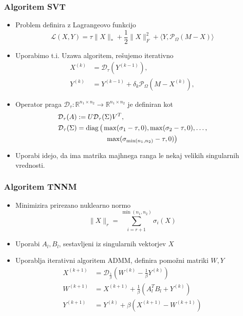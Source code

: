\documentclass{beamer}
\newcommand{\nnorm}[1]{\lVert#1\rVert_*}
\newcommand{\fnorm}[1]{\lVert#1\rVert_F}
\newcommand{\norm}[1]{\lVert#1\rVert}
\newcommand{\proj}{\mathcal{P}_\Omega}
\newcommand{\shrink}{\mathcal{D}}
\newcommand{\trOp}[2]{\langle #1, #2 \rangle}
\DeclareMathOperator{\diag}{diag}
\begin{document}
\begin{frame}
  \frametitle{Algoritem SVT}
  \begin{itemize}
    \item Problem definira z \alert{Lagrangeovo funkcijo} \[
            \mathcal{L}(X, Y) = \tau \nnorm{X} + \frac{1}{2}\fnorm{X}^2 + \trOp{Y}{\proj(M-X)}
          \]
    \item Uporabimo t.i. \alert{Uzawa algoritem}, rešujemo iterativno
          \begin{align*}
            X^{(k)} & = \shrink_\tau(Y^{(k-1)}),                 \\
            Y^{(k)} & = Y^{(k-1)} + \delta_k \proj(M - X^{(k)}),
          \end{align*}
    \item \alert{Operator praga} $\shrink_\tau: \mathbb{R}^{n_1 \times n_2} \rightarrow \mathbb{R}^{n_1 \times n_2}$ je definiran kot
          \begin{align*}
            \shrink_\tau(A) & := U \shrink_\tau(\Sigma) V^T, \\ \shrink_\tau(\Sigma) &= \diag\big(\max(\sigma_1 - \tau, 0),
            \max(\sigma_2-\tau,0),\ldots,                    \\
                            & \hspace{1.5cm}
            \max(\sigma_{\min(n_1,n_2)}-\tau,0)\big)
          \end{align*}
    \item Uporabi idejo, da ima matrika majhnega ranga \alert{le nekaj velikih singularnih vrednosti}.
  \end{itemize}
\end{frame}

\begin{frame}
  \frametitle{Algoritem TNNM}
  \begin{itemize}
    \item Minimizira \alert{prirezano nuklearno normo} \[
            \norm{X}_r = \sum_{i = r + 1}^{\min(n_1, n_2)} \sigma_i(X)
          \]
    \item Uporabi $A_l, B_l$, sestavljeni iz \alert{singularnih vektorjev} $X$
    \item Uporablja iterativni algoritem \alert{ADMM}, definira pomožni matriki $W, Y$
          \begin{align*}
            X^{(k+1)} & = \shrink_\frac{1}{\beta}(W^{(k)} - \frac{1}{\beta} Y^{(k)}) \\
            W^{(k+1)} & = X^{(k+1)} + \frac{1}{\beta}(A_l^T B_l + Y^{(k)})           \\
            Y^{(k+1)} & = Y^{(k)} + \beta(X^{(k+1)}- W^{(k+1)})
          \end{align*}
  \end{itemize}
\end{frame}
\end{document}
